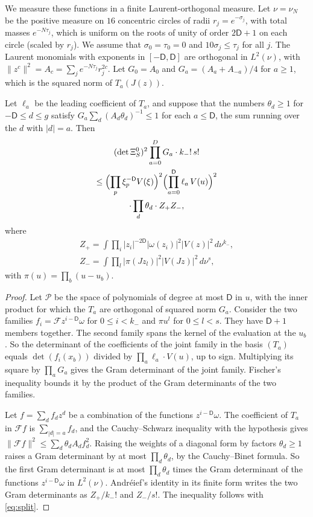 We measure these functions in a finite Laurent-orthogonal measure. Let $\nu=\nu_N$ be the positive measure on $16$
concentric circles of radii $r_j=e^{-\sigma_j}$, with total masses $e^{-N\tau_j}$, which is uniform on the roots of unity
of order $2\mathsf D+1$ on each circle (scaled by $r_j$). We assume that $\sigma_0=\tau_0=0$ and $10\sigma_j\le\tau_j$ for all
$j$. The Laurent monomials with exponents in $[-\mathsf D,\mathsf D]$ are orthogonal in $L^2(\nu)$, with $\|z^c\|^2=A_c=\sum_je^{-N\tau_j}r_j^{2c}$. Let $G_0=A_0$ and $G_a=(A_a+A_{-a})/4$ for $a\ge1$, which is the squared
norm of $T_a(J(z))$.

\begin{proposition}\label{prop:gram}
Let $\ell_a$ be the leading coefficient of $T_a$, and suppose that the numbers $\theta_d\ge1$ for $-\mathsf D\le d\le g$ satisfy
$G_a\sum_{d}(A_d\theta_d)^{-1}\le1$ for each $a\le \mathsf D$, the sum running over the $d$ with $|d|=a$. Then
\begin{multline*}
 (\det\Xi^0_S)^2\prod_{a=0}^DG_a\cdot k_-!\,s!\\
 \le\Bigl(\prod_p\xi_p^{-\mathsf D}V(\xi)\Bigr)^2\Bigl(\prod_{a=0}^{\mathsf D}\ell_a\,V(u)\Bigr)^2\\
 \cdot\prod_d\theta_d\cdot Z_+Z_-,
\end{multline*}
where
\begin{gather*}
 Z_+=\int\prod_i|z_i|^{-2\mathsf D}|\omega(z_i)|^2|V(z)|^2\,d\nu^{k_-},\\
 Z_-=\int\prod_l|\pi(Jz_l)|^2|V(Jz)|^2\,d\nu^{s},
\end{gather*}
with $\pi(u)=\prod_b(u-u_b)$.
\end{proposition}

\begin{proof}
Let $\mathcal P$ be the space of polynomials of degree at most $\mathsf D$ in $u$, with the inner product for which the $T_a$ are
orthogonal of squared norm $G_a$. Consider the two families $f_i=\mathcal Fz^{i-\mathsf D}\omega$ for $0\le i<k_-$ and $\pi u^l$ for $0\le l<s$.
They have $\mathsf D+1$ members together. The second family spans the kernel of the evaluation at the $u_b$. So the
determinant of the coefficients of the joint family in the basis $(T_a)$ equals $\det(f_i(x_b))$ divided by
$\prod_a\ell_a\cdot V(u)$, up to sign. Multiplying its square by $\prod_aG_a$ gives the Gram determinant of the joint family.
Fischer's inequality bounds it by the product of the Gram determinants of the two families.

Let $f=\sum_df_dz^d$ be a combination of the functions $z^{i-\mathsf D}\omega$. The coefficient of $T_a$ in $\mathcal Ff$ is
$\sum_{|d|=a}f_d$, and the Cauchy--Schwarz inequality with the hypothesis gives $\|\mathcal Ff\|^2\le\sum_d\theta_dA_df_d^2$. Raising
the weights of a diagonal form by factors $\theta_d\ge1$ raises a Gram determinant by at most $\prod_d\theta_d$, by the
Cauchy--Binet formula. So the first Gram determinant is at most $\prod_d\theta_d$ times the Gram determinant of the
functions $z^{i-\mathsf D}\omega$ in $L^2(\nu)$. Andr\'eief's identity \cite{Forrester2018Andreief} in its finite form writes the two Gram
determinants as $Z_+/k_-!$ and $Z_-/s!$. The inequality follows with \eqref{eq:split}.
\end{proof}

